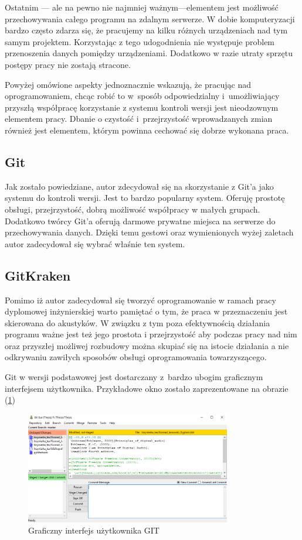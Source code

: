 \documentclass[eng,printmode]{mgr}
\begin{document}
Ostatnim --- ale na pewno nie najmniej ważnym---elementem jest możliwość przechowywania całego programu na zdalnym serwerze. W dobie komputeryzacji bardzo często zdarza się, że pracujemy na kilku różnych urządzeniach nad tym samym projektem. Korzystając z tego udogodnienia nie występuje problem przenoszenia danych pomiędzy urządzeniami. Dodatkowo w razie utraty sprzętu postępy pracy nie zostają stracone.
 
Powyżej omówione aspekty jednoznacznie wskazują, że pracując nad oprogramowaniem, chcąc robić to w~sposób odpowiedzialny i~umożliwiający przyszłą współpracę korzystanie z systemu kontroli wersji jest nieodzownym elementem pracy. Dbanie o czystość i~przejrzystość wprowadzanych zmian również jest elementem, którym powinna cechować się dobrze wykonana praca. 

\subsection{Git}
Jak zostało powiedziane, autor zdecydował się na skorzystanie z Git'a jako systemu do kontroli wersji. Jest to bardzo popularny system. Oferuję prostotę obsługi, przejrzystość, dobrą możliwość współpracy w małych grupach. Dodatkowo twórcy Git'a oferują darmowe prywatne miejsca na serwerze do przechowywania danych. Dzięki temu gestowi oraz wymienionych wyżej zaletach autor zadecydował się wybrać właśnie ten system. 

\subsection{GitKraken}
Pomimo iż autor zadecydował się tworzyć oprogramowanie w ramach pracy dyplomowej inżynierskiej warto pamiętać o tym, że praca w przeznaczeniu jest skierowana do akustyków. W związku z tym poza efektywnością działania programu ważne jest też jego prostota i przejrzystość aby podczas pracy nad nim oraz przyszłej możliwej rozbudowy można skupiać się na istocie działania a nie odkrywaniu zawiłych sposobów obsługi oprogramowania towarzyszącego.

Git w wersji podstawowej jest dostarczany z~bardzo ubogim graficznym interfejsem użytkownika. Przykładowe okno zostało zaprezentowane na obrazie (\ref{git_gui})

\begin{figure}[hbtp]  
	\caption{Graficzny interfejs użytkownika GIT}
	\label{git_gui}   
	\centering
	\includegraphics[width=0.8\textwidth]{git_gui.PNG}
\end{figure} 
 
\end{document}
